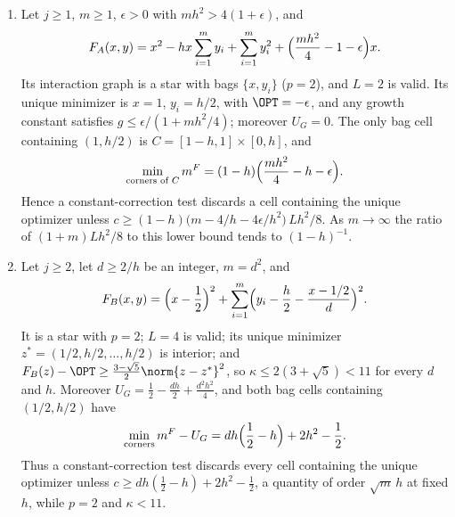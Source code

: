 \begin{proposition}\label{prop:star}
\leavevmode
\begin{enumerate}
\item[(A)] Let $j\ge1$, $m\ge1$, $\epsilon>0$ with $mh^2>4(1+\epsilon)$, and
\[
F_A(x,y)=x^2-hx\sum_{i=1}^my_i+\sum_{i=1}^my_i^2
+\Bigl(\frac{mh^2}4-1-\epsilon\Bigr)x .
\]
Its interaction graph is a star with bags $\{x,y_i\}$ ($p=2$), and $L=2$
is valid. Its unique minimizer is $x=1$, $y_i=h/2$, with $\OPT=-\epsilon$,
and any growth constant satisfies $g\le\epsilon/(1+mh^2/4)$; moreover
$U_G=0$. The only bag cell containing $(1,h/2)$ is
$C=[1-h,1]\times[0,h]$, and
\[
\min_{\text{corners of }C}m^F=(1-h)\Bigl(\frac{mh^2}4-h-\epsilon\Bigr).
\]
Hence a constant-correction test discards a cell containing the unique
optimizer unless
$c\ge(1-h)\bigl(m-4/h-4\epsilon/h^2\bigr)\,Lh^2/8$. As $m\to\infty$ the
ratio of $(1+m)Lh^2/8$ to this lower bound tends to $(1-h)^{-1}$.
\item[(B)] Let $j\ge2$, let $d\ge2/h$ be an integer, $m=d^2$, and
\[
F_B(x,y)=\Bigl(x-\frac12\Bigr)^2+\sum_{i=1}^m
\Bigl(y_i-\frac h2-\frac{x-1/2}{d}\Bigr)^2 .
\]
It is a star with $p=2$; $L=4$ is valid; its unique minimizer
$z^*=(1/2,h/2,\ldots,h/2)$ is interior; and
$F_B(z)-\OPT\ge\frac{3-\sqrt5}2\norm{z-z^*}^2$, so
$\kappa\le2(3+\sqrt5)<11$ for every $d$ and $h$. Moreover
$U_G=\frac12-\frac{dh}2+\frac{d^2h^2}4$, and both bag cells containing
$(1/2,h/2)$ have
\[
\min_{\text{corners}}m^F-U_G=dh\Bigl(\frac12-h\Bigr)+2h^2-\frac12 .
\]
Thus a constant-correction test discards every cell containing the
unique optimizer unless $c\ge dh(\frac12-h)+2h^2-\frac12$, a quantity of
order $\sqrt m\,h$ at fixed $h$, while $p=2$ and $\kappa<11$.
\end{enumerate}
\end{proposition}

